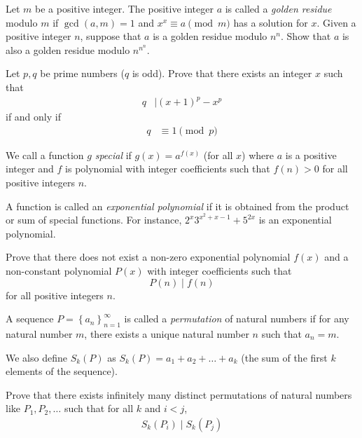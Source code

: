 \documentclass[problems.tex]{subfile}
\begin{document}
	\begin{problem}
		Let $m$ be a positive integer. The positive integer $a$ is called a \textit{golden residue} modulo $m$ if $\gcd(a,m)=1$ and $x^x \equiv a \pmod m$ has a solution for $x$. Given a positive integer $n$, suppose that $a$ is a golden residue modulo $n^n$. Show that $a$ is also a golden residue modulo $n^{n^n}$. %
	\end{problem}

	\begin{problem}
		Let $p,q$ be prime numbers ($q$ is odd). Prove that there exists an integer $x$ such that
			\begin{align*}
				q
					& \mid (x+1)^p-x^p
			\end{align*}
		if and only if
			\begin{align*}
				q
					& \equiv 1 \pmod p
			\end{align*}
	\end{problem}

	\begin{problem}
		We call a function $g$ \textit{special} if $g(x)=a^{f(x)}$ (for all $x$) where $a$ is a positive integer and $f$ is polynomial with integer coefficients such that $f(n)>0$ for all positive integers $n$.

		A function is called an \textit{exponential polynomial} if it is obtained from the product or sum of special functions. For instance, $2^{x}3^{x^{2}+x-1}+5^{2x}$ is an exponential polynomial.

		Prove that there does not exist a non-zero exponential polynomial $f(x)$ and a non-constant polynomial $P(x)$ with integer coefficients such that
		$$P(n)\mid f(n)$$for all positive integers $n$. %
	\end{problem}

	\begin{problem}
		A sequence $P=\left \{ a_{n} \right \}_{n=1}^{\infty}$ is called a \textit{permutation} of natural numbers if for any natural number $m$, there exists a unique natural number $n$ such that $a_n=m.$

		We also define $S_k(P)$ as
		$S_k(P)=a_{1}+a_{2}+\dots +a_{k}$ (the sum of the first $k$ elements of the sequence).

		Prove that there exists infinitely many distinct permutations of natural numbers like $P_1,P_2, \dots$ such that for all $k$ and $i<j$,
			\begin{align*}
				S_k(P_i)\mid S_k(P_j)
			\end{align*}
	\end{problem}
\end{document}
